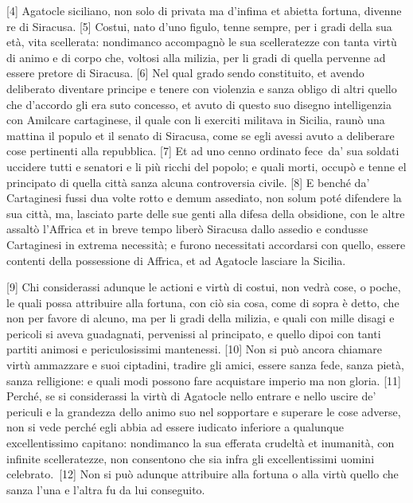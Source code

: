 {[}4{]} Agatocle siciliano, non solo di privata ma d'infima et abietta
fortuna, divenne re di Siracusa. {[}5{]} Costui, nato d'uno figulo,
tenne sempre, per i gradi della sua età, vita scellerata: nondimanco
accompagnò le sua scelleratezze con tanta virtù di animo e di corpo che,
voltosi alla milizia, per li gradi di quella pervenne ad essere pretore
di Siracusa. {[}6{]} Nel qual grado sendo constituito, et avendo
deliberato diventare principe e tenere con violenzia e sanza obligo di
altri quello che d'accordo gli era suto concesso, et avuto di questo suo
disegno intelligenzia con Amilcare cartaginese, il quale con li exerciti
militava in Sicilia, raunò una mattina il populo et il senato di
Siracusa, come se egli avessi avuto a deliberare cose pertinenti alla
repubblica. {[}7{]} Et ad uno cenno ordinato fece\est\ da' sua soldati
uccidere tutti e senatori e li più ricchi del popolo; e quali morti,
occupò e tenne el principato di quella città sanza alcuna controversia
civile. {[}8{]} E benché da' Cartaginesi fussi dua volte rotto e demum
assediato, non solum poté difendere la sua città, ma, lasciato parte
delle sue genti alla difesa della obsidione, con le altre assaltò
l'Affrica et in breve tempo liberò Siracusa dallo assedio e condusse
Cartaginesi in extrema necessità; e furono necessitati accordarsi con
quello, essere contenti della possessione di Affrica, et ad Agatocle
lasciare la Sicilia.

{[}9{]} Chi considerassi adunque le actioni e virtù di costui, non vedrà
cose, o poche, le quali possa attribuire alla fortuna, con ciò sia cosa,
come di sopra è detto, che non per favore di alcuno, ma per li gradi
della milizia, e quali con mille disagi e pericoli si aveva guadagnati,
pervenissi al principato, e quello dipoi con tanti partiti animosi e
periculosissimi mantenessi. {[}10{]} Non si può ancora chiamare virtù
ammazzare e suoi ciptadini, tradire gli amici, essere sanza fede, sanza
pietà, sanza relligione: e quali modi possono fare acquistare imperio ma
non gloria. {[}11{]} Perché, se si considerassi la virtù di Agatocle
nello entrare e nello uscire de' periculi e la grandezza dello animo suo
nel sopportare e superare le cose adverse, non si vede perché egli abbia
ad essere iudicato inferiore a qualunque excellentissimo capitano:
nondimanco la sua efferata crudeltà et inumanità, con infinite
scelleratezze, non consentono che sia infra gli excellentissimi uomini
celebrato.\est\ {[}12{]} Non si può adunque attribuire alla fortuna o alla
virtù quello che sanza l'una e l'altra fu da lui conseguito.

